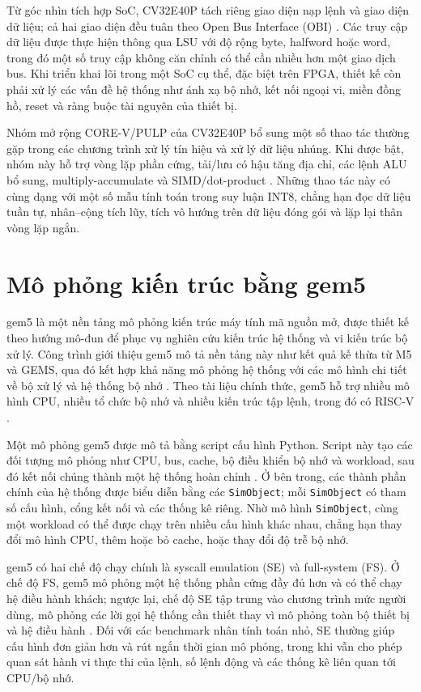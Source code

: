\documentclass[../DoAn.tex]{subfiles}
\begin{document}
Từ góc nhìn tích hợp SoC, CV32E40P tách riêng giao diện nạp lệnh và giao diện dữ liệu; cả hai giao diện đều tuân theo Open Bus Interface (OBI) \cite{openhw_cv32e40p_um_2024}. Các truy cập dữ liệu được thực hiện thông qua LSU với độ rộng byte, halfword hoặc word, trong đó một số truy cập không căn chỉnh có thể cần nhiều hơn một giao dịch bus. Khi triển khai lõi trong một SoC cụ thể, đặc biệt trên FPGA, thiết kế còn phải xử lý các vấn đề hệ thống như ánh xạ bộ nhớ, kết nối ngoại vi, miền đồng hồ, reset và ràng buộc tài nguyên của thiết bị.

Nhóm mở rộng CORE-V/PULP của CV32E40P bổ sung một số thao tác thường gặp trong các chương trình xử lý tín hiệu và xử lý dữ liệu nhúng. Khi được bật, nhóm này hỗ trợ vòng lặp phần cứng, tải/lưu có hậu tăng địa chỉ, các lệnh ALU bổ sung, multiply-accumulate và SIMD/dot-product \cite{openhw_cv32e40p_um_2024}. Những thao tác này có cùng dạng với một số mẫu tính toán trong suy luận INT8, chẳng hạn đọc dữ liệu tuần tự, nhân--cộng tích lũy, tích vô hướng trên dữ liệu đóng gói và lặp lại thân vòng lặp ngắn.

\section{Mô phỏng kiến trúc bằng gem5}
\label{sec:gem5}

gem5 là một nền tảng mô phỏng kiến trúc máy tính mã nguồn mở, được thiết kế theo hướng mô-đun để phục vụ nghiên cứu kiến trúc hệ thống và vi kiến trúc bộ xử lý. Công trình giới thiệu gem5 mô tả nền tảng này như kết quả kế thừa từ M5 và GEMS, qua đó kết hợp khả năng mô phỏng hệ thống với các mô hình chi tiết về bộ xử lý và hệ thống bộ nhớ \cite{binkert2011gem5}. Theo tài liệu chính thức, gem5 hỗ trợ nhiều mô hình CPU, nhiều tổ chức bộ nhớ và nhiều kiến trúc tập lệnh, trong đó có RISC-V \cite{gem5_docs_2026}.

Một mô phỏng gem5 được mô tả bằng script cấu hình Python. Script này tạo các đối tượng mô phỏng như CPU, bus, cache, bộ điều khiển bộ nhớ và workload, sau đó kết nối chúng thành một hệ thống hoàn chỉnh \cite{gem5_docs_2026}. Ở bên trong, các thành phần chính của hệ thống được biểu diễn bằng các \texttt{SimObject}; mỗi \texttt{SimObject} có tham số cấu hình, cổng kết nối và các thống kê riêng. Nhờ mô hình \texttt{SimObject}, cùng một workload có thể được chạy trên nhiều cấu hình khác nhau, chẳng hạn thay đổi mô hình CPU, thêm hoặc bỏ cache, hoặc thay đổi độ trễ bộ nhớ.

gem5 có hai chế độ chạy chính là syscall emulation (SE) và full-system (FS). Ở chế độ FS, gem5 mô phỏng một hệ thống phần cứng đầy đủ hơn và có thể chạy hệ điều hành khách; ngược lại, chế độ SE tập trung vào chương trình mức người dùng, mô phỏng các lời gọi hệ thống cần thiết thay vì mô phỏng toàn bộ thiết bị và hệ điều hành \cite{gem5_docs_2026}. Đối với các benchmark nhân tính toán nhỏ, SE thường giúp cấu hình đơn giản hơn và rút ngắn thời gian mô phỏng, trong khi vẫn cho phép quan sát hành vi thực thi của lệnh, số lệnh động và các thống kê liên quan tới CPU/bộ nhớ.
\end{document}
